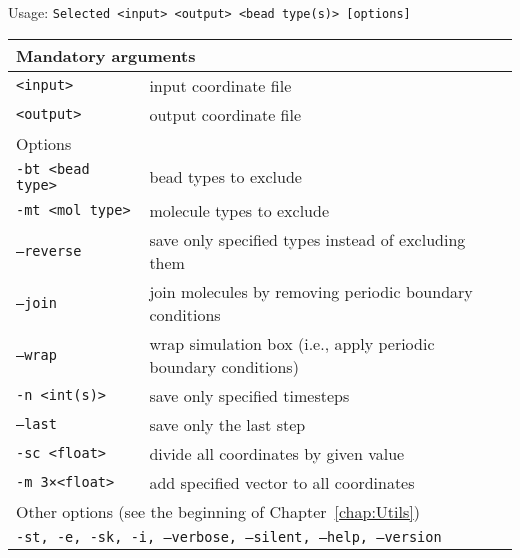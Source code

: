 \vspace{1em}
\noindent
Usage: \tt{Selected <input> <output> <bead type(s)> [options]}
\noindent
\begin{longtable}{p{}p{}}
  \toprule
  \multicolumn{2}{l}{Mandatory arguments}\\
  \midrule
  \tt{<input>}        & input coordinate file\\
  \tt{<output>}       & output coordinate file\\
  \midrule
  \multicolumn{2}{l}{Options}\\
  \midrule
  \tt{-bt <bead type>} & bead types to exclude\\
  \tt{-mt <mol type>}  & molecule types to exclude\\
  \tt{--reverse}       & save only specified types instead of excluding them\\
  \tt{--join}          & join molecules by removing periodic boundary
                         conditions\\
  \tt{--wrap}          & wrap simulation box (i.e., apply periodic boundary
                         conditions)\\
  \tt{-n <int(s)>}     & save only specified timesteps\\
  \tt{--last}          & save only the last step\\
  \tt{-sc <float>}     & divide all coordinates by given value\\
  \tt{-m 3×<float>}    & add specified vector to all coordinates\\
  \midrule
  \multicolumn{2}{l}{Other options (see the beginning of
                     Chapter~\ref{chap:Utils})}\\
  \midrule
  \multicolumn{2}{p{0.948\textwidth}}{\tt{-st},
                                      \tt{-e},
                                      \tt{-sk},
                                      \tt{-i},
                                      \tt{--verbose},
                                      \tt{--silent},
                                      \tt{--help},
                                      \tt{--version}}\\
  \bottomrule
\end{longtable}
